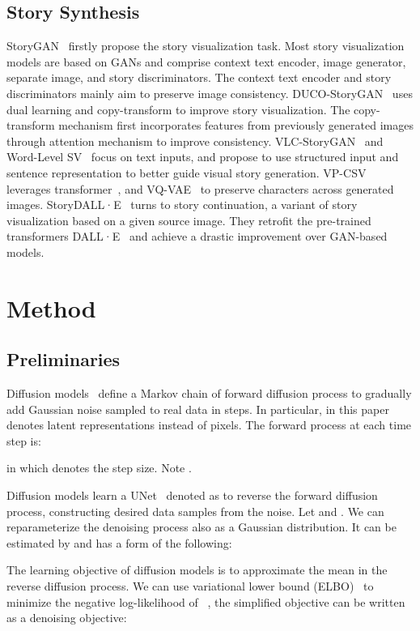 \documentclass[10pt,twocolumn,letterpaper]{article}
\begin{document}
\subsection{Story Synthesis}
StoryGAN~\cite{storygan} firstly propose the story visualization task. Most story visualization models are based on GANs and comprise context text encoder, image generator, separate image, and story discriminators. The context text encoder and story discriminators mainly aim to preserve image consistency. DUCO-StoryGAN~\cite{ducostorygan} uses dual learning and copy-transform to improve story visualization. The copy-transform mechanism first incorporates features from previously generated images through attention mechanism to improve consistency. VLC-StoryGAN~\cite{vlcstorygan} and Word-Level SV~\cite{wordlevelsv} focus on text inputs, and propose to use structured input and sentence representation to better guide visual story generation. VP-CSV~\cite{vpcsv} leverages transformer~\cite{transformer}, and VQ-VAE~\cite{vqvae} to preserve characters across generated images. StoryDALL·E~\cite{storydalle} turns to story continuation, a variant of story visualization based on a given source image. They retrofit the pre-trained transformers DALL·E~\cite{dalle} and achieve a drastic improvement over GAN-based models.

\section{Method}
\subsection{Preliminaries}
Diffusion models~\cite{diffusionmodel} define a Markov chain of forward diffusion process  to gradually add Gaussian noise sampled to real data  in  steps. In particular,  in this paper denotes latent representations instead of pixels. The forward process  at each time step  is:

in which  denotes the step size. Note .

Diffusion models learn a UNet~\cite{unet} denoted as  to reverse the forward diffusion process, constructing desired data samples from the noise. Let  and . We can reparameterize the denoising process  also as a Gaussian distribution. It can be estimated by  and has a form of the following:


The learning objective of diffusion models is to approximate the mean  in the reverse diffusion process. We can use variational lower bound (ELBO)~\cite{vae} to minimize the negative log-likelihood of ~\cite{ddpm}, the simplified objective can be written as a denoising objective:
\end{document}
